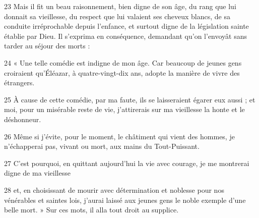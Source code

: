 
23 Mais il fit un beau raisonnement, bien digne de son âge, du rang que lui donnait sa vieillesse, du respect que lui valaient ses cheveux blancs, de sa conduite irréprochable depuis l’enfance, et surtout digne de la législation sainte établie par Dieu. Il s’exprima en conséquence, demandant qu’on l’envoyât sans tarder au séjour des morts :

24 « Une telle comédie est indigne de mon âge. Car beaucoup de jeunes gens croiraient qu’Éléazar, à quatre-vingt-dix ans, adopte la manière de vivre des étrangers.

25 À cause de cette comédie, par ma faute, ils se laisseraient égarer eux aussi ; et moi, pour un misérable reste de vie, j’attirerais sur ma vieillesse la honte et le déshonneur.

26 Même si j’évite, pour le moment, le châtiment qui vient des hommes, je n’échapperai pas, vivant ou mort, aux mains du Tout-Puissant.

27 C’est pourquoi, en quittant aujourd’hui la vie avec courage, je me montrerai digne de ma vieillesse

28 et, en choisissant de mourir avec détermination et noblesse pour nos vénérables et saintes lois, j’aurai laissé aux jeunes gens le noble exemple d’une belle mort. » Sur ces mots, il alla tout droit au supplice.